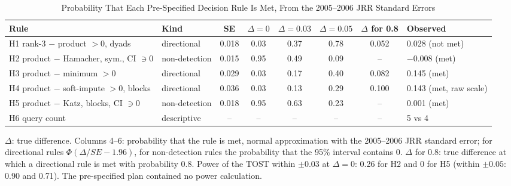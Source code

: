 \documentclass[journal]{IEEEtran}
\begin{document}
\setcounter{table}{13}\begin{table}[!t]
\caption{Probability That Each Pre-Specified Decision Rule Is Met, From the 2005--2006 JRR Standard Errors}
\centering
\scriptsize
\setlength{\tabcolsep}{3pt}
\begin{tabular}{@{}l l c c c c c l@{}}
\toprule
Rule & Kind & SE & $\Delta=0$ & $\Delta=0.03$ & $\Delta=0.05$ & $\Delta$ for 0.8 & Observed\\
\midrule
H1 rank-3 $-$ product $>0$, dyads & directional & 0.018 & 0.03 & 0.37 & 0.78 & 0.052 & 0.028 (not met)\\
H2 product $-$ Hamacher, sym., CI $\ni0$ & non-detection & 0.015 & 0.95 & 0.49 & 0.09 & -- & $-0.008$ (met)\\
H3 product $-$ minimum $>0$ & directional & 0.029 & 0.03 & 0.17 & 0.40 & 0.082 & 0.145 (met)\\
H4 product $-$ soft-impute $>0$, blocks & directional & 0.036 & 0.03 & 0.13 & 0.29 & 0.100 & 0.143 (met, raw scale)\\
H5 product $-$ Katz, blocks, CI $\ni0$ & non-detection & 0.018 & 0.95 & 0.63 & 0.23 & -- & 0.001 (met)\\
H6 query count & descriptive & -- & -- & -- & -- & -- & 5 vs 4\\
\bottomrule
\end{tabular}

\smallskip
\parbox{\textwidth}{\scriptsize $\Delta$: true difference. Columns 4--6: probability that the rule is met, normal approximation with the 2005--2006 JRR standard error; for directional rules $\Phi(\Delta/SE-1.96)$, for non-detection rules the probability that the 95\% interval contains 0. $\Delta$ for 0.8: true difference at which a directional rule is met with probability 0.8. Power of the TOST within $\pm0.03$ at $\Delta=0$: 0.26 for H2 and 0 for H5 (within $\pm0.05$: 0.90 and 0.71). The pre-specified plan contained no power calculation.}
\end{table}
\end{document}
